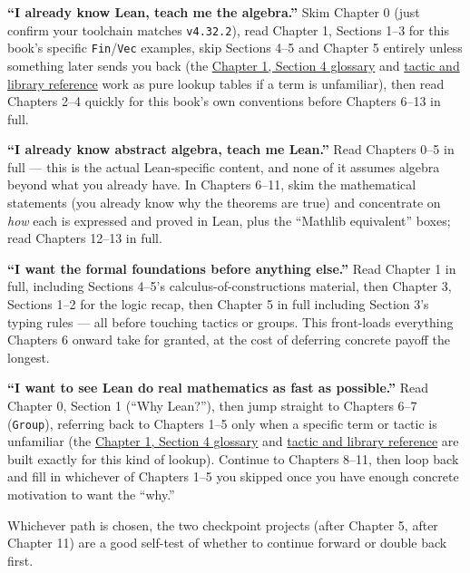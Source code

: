 \textbf{``I already know Lean, teach me the algebra.''} Skim Chapter 0 (just confirm your toolchain matches \texttt{v4.32.2}), read Chapter 1, Sections 1--3 for this book's specific \texttt{Fin}/\texttt{Vec} examples, skip Sections 4--5 and Chapter 5 entirely unless something later sends you back (the \hyperref[sec:01-basics:04-terminology:1]{Chapter 1, Section 4 glossary} and \hyperref[sec:root:tactic-and-library-reference:1]{tactic and library reference} work as pure lookup tables if a term is unfamiliar), then read Chapters 2--4 quickly for this book's own conventions before Chapters 6--13 in full.

\textbf{``I already know abstract algebra, teach me Lean.''} Read Chapters 0--5 in full --- this is the actual Lean-specific content, and none of it assumes algebra beyond what you already have. In Chapters 6--11, skim the mathematical statements (you already know why the theorems are true) and concentrate on \emph{how} each is expressed and proved in Lean, plus the ``Mathlib equivalent'' boxes; read Chapters 12--13 in full.

\textbf{``I want the formal foundations before anything else.''} Read Chapter 1 in full, including Sections 4--5's calculus-of-constructions material, then Chapter 3, Sections 1--2 for the logic recap, then Chapter 5 in full including Section 3's typing rules --- all before touching tactics or groups. This front-loads everything Chapters 6 onward take for granted, at the cost of deferring concrete payoff the longest.

\textbf{``I want to see Lean do real mathematics as fast as possible.''} Read Chapter 0, Section 1 (``Why Lean?''), then jump straight to Chapters 6--7 (\texttt{Group}), referring back to Chapters 1--5 only when a specific term or tactic is unfamiliar (the \hyperref[sec:01-basics:04-terminology:1]{Chapter 1, Section 4 glossary} and \hyperref[sec:root:tactic-and-library-reference:1]{tactic and library reference} are built exactly for this kind of lookup). Continue to Chapters 8--11, then loop back and fill in whichever of Chapters 1--5 you skipped once you have enough concrete motivation to want the ``why.''

Whichever path is chosen, the two checkpoint projects (after Chapter 5, after Chapter 11) are a good self-test of whether to continue forward or double back first.
